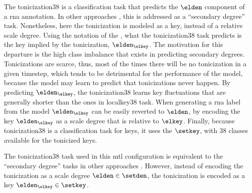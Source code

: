 

The \gls{tonicization38} is a classification task that
predicts the $\elden$ component of a \gls{rna} annotation.
In other approaches
\parencite{chen2021attend,micchi2021deep}, this is addressed
as a ``secondary degree'' task. Nonetheless, here the
tonicization is modeled as a key, instead of a relative
scale degree. Using the notation of the
, what
the \gls{tonicization38} task predicts is the key implied by
the tonicization, $\elden_{\elkey}$. The motivation for this
departure is the high class imbalance that exists in
predicting secondary degrees. Tonicizations are scarce,
thus, most of the times there will be no tonicization in a
given timestep, which tends to be detrimental for the
performance of the model, because the model may learn to
predict that tonicizations never happen. By predicting
$\elden_{\elkey}$, the \gls{tonicization38} learns key
fluctuations that are generally shorter than the ones in
\gls{localkey38} task. When generating a \gls{rna} label
from the model $\elden_{\elkey}$ can be easily reverted to
$\elden$, by encoding the key $\elden_{\elkey}$ as a scale
degree that is relative to $\elkey$. Finally, because
\gls{tonicization38} is a classification task for keys, it
uses the $\setkey$, with 38 classes available for the
tonicized keys.

The \gls{tonicization38} task used in this \gls{mtl}
configuration is equivalent to the ``secondary degree''
tasks in other approaches
\parencite{chen2021attend,micchi2021deep}. However, instead
of encoding the tonicization as a scale degree $\elden \in
\setden$, the tonicization is encoded as a key
$\elden_\elkey \in \setkey$. 

